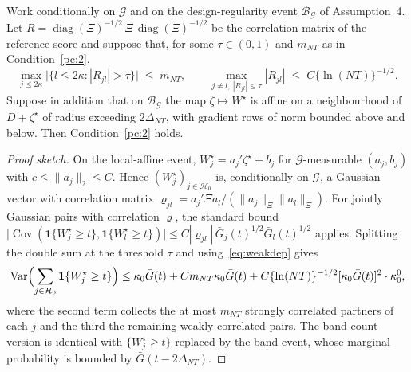 \begin{lemma}
\label{lem:pc2}
Work conditionally on $\mathcal{G}$ and on the design-regularity event
$\mathcal{B}_\mathcal{G}$ of Assumption~4.  Let $R = \operatorname{diag}(\Xi)^{-1/2}
\,\Xi\, \operatorname{diag}(\Xi)^{-1/2}$ be the correlation matrix of the
reference score and suppose that, for some $\tau \in (0,1)$ and
$m_{NT}$ as in Condition~\ref{pc:2},
\begin{equation}
\label{eq:weakdep}
\max_{j \le 2\kappa} \bigl| \{ l \le 2\kappa : |R_{jl}| > \tau \} \bigr|
   \;\le\; m_{NT},
\qquad
\max_{j \ne l,\ |R_{jl}| \le \tau} |R_{jl}| \;\le\; C \{\ln (NT)\}^{-1/2}.
\end{equation}
Suppose in addition that on $\mathcal{B}_\mathcal{G}$ the map
$\zeta \mapsto W^\star$ is affine on a neighbourhood of $D + \zeta^\star$ of
radius exceeding $2\Delta_{NT}$, with gradient rows of norm bounded above and
below.  Then Condition~\ref{pc:2} holds.
\end{lemma}

\begin{proof}[Proof sketch]
On the local-affine event, $W_j^\star = a_j' \zeta^\star + b_j$ for
$\mathcal{G}$-measurable $(a_j, b_j)$ with $c \le \|a_j\|_2 \le C$.  Hence
$(W_j^\star)_{j \in \mathcal{H}_0}$ is, conditionally on $\mathcal{G}$, a
Gaussian vector with correlation matrix $\varrho_{jl} = a_j'\Xi a_l /
(\|a_j\|_\Xi \|a_l\|_\Xi)$.  For jointly Gaussian pairs with correlation
$\varrho$, the standard bound
$\bigl|\operatorname{Cov}(\mathbf 1\{W_j^\star \ge t\},
\mathbf 1\{W_l^\star \ge t\})\bigr| \le C|\varrho_{jl}|\,
\bar G_j(t)^{1/2}\bar G_l(t)^{1/2}$ applies.  Splitting the double sum at the
threshold $\tau$ and using~\eqref{eq:weakdep} gives
\[
\operatorname{Var}\Bigl(\sum_{j \in \mathcal{H}_0}\mathbf 1\{W_j^\star \ge t\}\Bigr)
\le \kappa_0 \bar G(t)
 + C m_{NT} \kappa_0 \bar G(t)
 + C \{\ln (NT)\}^{-1/2} [\kappa_0\bar G(t)]^{2}\cdot \kappa_0^{0},
\]
where the second term collects the at most $m_{NT}$ strongly correlated
partners of each $j$ and the third the remaining weakly correlated pairs.
The band-count version is identical with
$\{W_j^\star \ge t\}$ replaced by the band event, whose marginal probability is
bounded by $\bar G(t - 2\Delta_{NT})$.
\end{proof}

